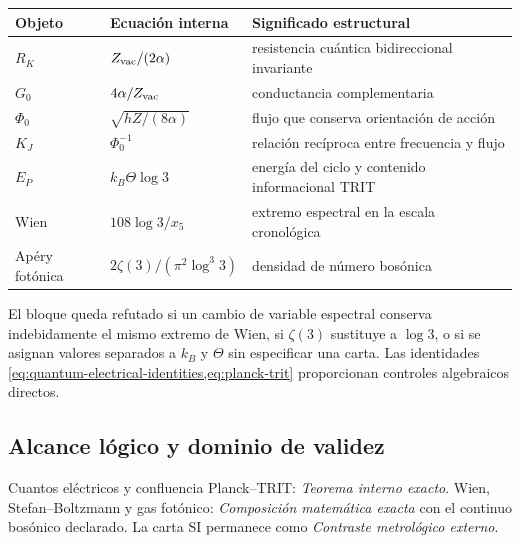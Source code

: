 \begin{longtable}{@{}p{}p{}p{}@{}}
\toprule
Objeto & Ecuaci\'on interna & Significado estructural\\
\midrule
\endhead
\(R_K\) & \(Z_{\rm vac}/(2\alpha)\) & resistencia cu\'antica bidireccional invariante\\
\(G_0\) & \(4\alpha/Z_{\rm vac}\) & conductancia complementaria\\
\(\Phi_0\) & \(\sqrt{hZ/(8\alpha)}\) & flujo que conserva orientaci\'on de acci\'on\\
\(K_J\) & \(\Phi_0^{-1}\) & relaci\'on rec\'iproca entre frecuencia y flujo\\
\(E_P\) & \(k_B\Theta\log3\) & energ\'ia del ciclo y contenido informacional TRIT\\
Wien & \(108\log3/x_5\) & extremo espectral en la escala cronol\'ogica\\
Ap\'ery fot\'onica & \(2\zeta(3)/(\pi^2\log^3 3)\) & densidad de n\'umero bos\'onica\\
\bottomrule
\end{longtable}

\begin{remark}
El bloque queda refutado si un cambio de variable espectral conserva
indebidamente el mismo extremo de Wien, si \(\zeta(3)\) sustituye a
\(\log3\), o si se asignan valores separados a \(k_B\) y \(\Theta\) sin
especificar una carta. Las identidades
\cref{eq:quantum-electrical-identities,eq:planck-trit} proporcionan controles
algebraicos directos.
\end{remark}

\subsection*{Alcance lógico y dominio de validez}
Cuantos el\'ectricos y confluencia Planck--TRIT: \emph{Teorema interno exacto}. Wien, Stefan--Boltzmann y gas fot\'onico: \emph{Composici\'on matem\'atica exacta} con el continuo bos\'onico declarado. La carta SI permanece como \emph{Contraste metrol\'ogico externo}.

